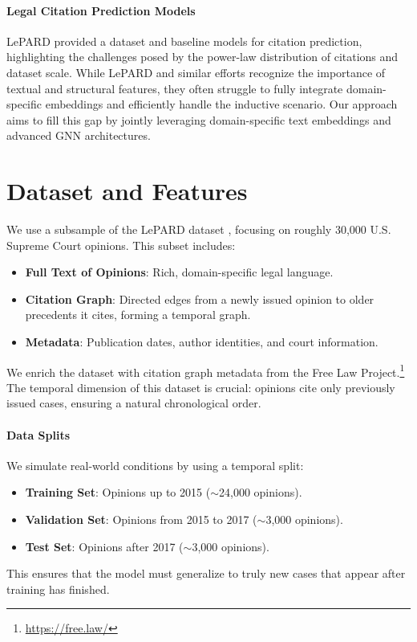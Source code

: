 \documentclass{article}
\begin{document}
\paragraph{Legal Citation Prediction Models}
LePARD \citep{mahari2022lepard} provided a dataset and baseline models for citation prediction, highlighting the challenges posed by the power-law distribution of citations and dataset scale. While LePARD and similar efforts recognize the importance of textual and structural features, they often struggle to fully integrate domain-specific embeddings and efficiently handle the inductive scenario. Our approach aims to fill this gap by jointly leveraging domain-specific text embeddings and advanced GNN architectures.

\section{Dataset and Features}
We use a subsample of the LePARD dataset \citep{mahari2022lepard}, focusing on roughly 30,000 U.S. Supreme Court opinions. This subset includes:
\begin{itemize}[leftmargin=*]
    \item \textbf{Full Text of Opinions}: Rich, domain-specific legal language.
    \item \textbf{Citation Graph}: Directed edges from a newly issued opinion to older precedents it cites, forming a temporal graph.
    \item \textbf{Metadata}: Publication dates, author identities, and court information.
\end{itemize}

We enrich the dataset with citation graph metadata from the Free Law Project.\footnote{\url{https://free.law/}} The temporal dimension of this dataset is crucial: opinions cite only previously issued cases, ensuring a natural chronological order.

\paragraph{Data Splits}
We simulate real-world conditions by using a temporal split:
\begin{itemize}[leftmargin=*]
    \item \textbf{Training Set}: Opinions up to 2015 ($\sim$24,000 opinions).
    \item \textbf{Validation Set}: Opinions from 2015 to 2017 ($\sim$3,000 opinions).
    \item \textbf{Test Set}: Opinions after 2017 ($\sim$3,000 opinions).
\end{itemize}
This ensures that the model must generalize to truly new cases that appear after training has finished.
\end{document}
